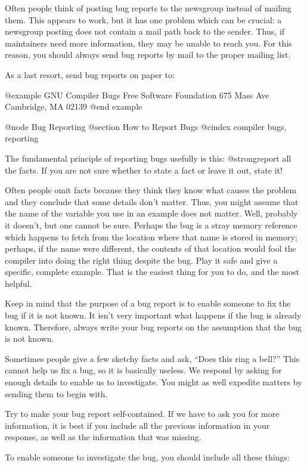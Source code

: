 Often people think of posting bug reports to the newsgroup instead of
mailing them.  This appears to work, but it has one problem which can be
crucial: a newsgroup posting does not contain a mail path back to the
sender.  Thus, if maintainers need more information, they may be unable
to reach you.  For this reason, you should always send bug reports by
mail to the proper mailing list.

As a last resort, send bug reports on paper to:

@example
GNU Compiler Bugs
Free Software Foundation
675 Mass Ave
Cambridge, MA 02139
@end example

@node Bug Reporting
@section How to Report Bugs
@cindex compiler bugs, reporting

The fundamental principle of reporting bugs usefully is this:
@strong{report all the facts}.  If you are not sure whether to state a
fact or leave it out, state it!

Often people omit facts because they think they know what causes the
problem and they conclude that some details don't matter.  Thus, you might
assume that the name of the variable you use in an example does not matter.
Well, probably it doesn't, but one cannot be sure.  Perhaps the bug is a
stray memory reference which happens to fetch from the location where that
name is stored in memory; perhaps, if the name were different, the contents
of that location would fool the compiler into doing the right thing despite
the bug.  Play it safe and give a specific, complete example.  That is the
easiest thing for you to do, and the most helpful.

Keep in mind that the purpose of a bug report is to enable someone to
fix the bug if it is not known.  It isn't very important what happens if
the bug is already known.  Therefore, always write your bug reports on
the assumption that the bug is not known.

Sometimes people give a few sketchy facts and ask, ``Does this ring a
bell?''  This cannot help us fix a bug, so it is basically useless.  We
respond by asking for enough details to enable us to investigate.
You might as well expedite matters by sending them to begin with.

Try to make your bug report self-contained.  If we have to ask you for
more information, it is best if you include all the previous information
in your response, as well as the information that was missing.

To enable someone to investigate the bug, you should include all these
things:

